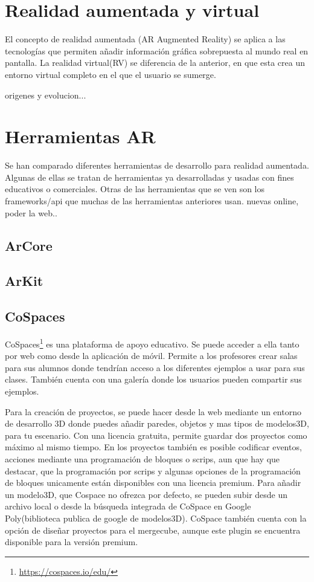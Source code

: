 

\section{Realidad aumentada y virtual}
El concepto de realidad aumentada (AR Augmented Reality) se aplica a las tecnologías que permiten añadir información gráfica sobrepuesta al mundo real en pantalla.
La realidad virtual(RV) se diferencia de la anterior, en que esta crea un entorno virtual completo en el que el usuario se sumerge.
 
origenes y evolucion...




\section{Herramientas AR}
Se han comparado diferentes herramientas de desarrollo para realidad aumentada. Algunas de ellas se tratan de herramientas ya desarrolladas y usadas con fines educativos o comerciales. Otras de las herramientas que se ven son los frameworks/api que muchas de las herramientas anteriores usan.
nuevas online, poder la web.. 

\subsection{ArCore}
\subsection{ArKit}
\subsection{CoSpaces} CoSpaces\footnote{\url{https://cospaces.io/edu/}} es una plataforma de apoyo educativo. Se puede acceder a ella tanto por web como desde la aplicación de móvil. Permite a los profesores crear salas para sus alumnos donde tendrían acceso a los diferentes ejemplos a usar para sus clases. También cuenta con una galería donde los usuarios pueden compartir sus ejemplos.

Para la creación de proyectos, se puede hacer desde la web mediante un entorno de desarrollo 3D donde puedes añadir paredes, objetos y mas tipos de modelos3D, para tu escenario. Con una licencia gratuita, permite guardar dos proyectos como máximo al mismo tiempo. En los proyectos también es posible codificar eventos, acciones mediante una programación de bloques o scrips, aun que hay que destacar, que la programación por scrips y algunas opciones de la programación de bloques unicamente están disponibles con una licencia premium. Para añadir un modelo3D, que Cospace no ofrezca por defecto, se pueden subir desde un archivo local o desde la búsqueda integrada de CoSpace en Google Poly(biblioteca publica de google de modelos3D).
CoSpace también cuenta con la opción de diseñar proyectos para el mergecube, aunque este plugin se encuentra disponible para la versión premium.

